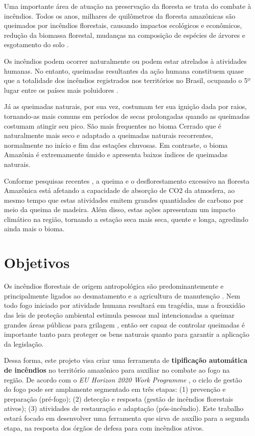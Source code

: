 Uma importante área de atuação na preservação da floresta se trata do combate à incêndios. Todos os anos, milhares de quilômetros da floresta amazônicas são queimados por incêndios florestais, causando impactos ecológicos e econômicos, redução da biomassa florestal, mudanças na composição de espécies de árvores e esgotamento do solo \cite{penha}. 

Os incêndios podem ocorrer naturalmente ou podem estar atrelados à atividades humanas. No entanto, queimadas resultantes da ação humana constituem quase que a totalidade dos incêndios registrados nos territórios no Brasil, ocupando o 5º lugar entre os países mais poluidores \cite{bdqueimadas}.

Já as queimadas naturais, por sua vez, costumam ter sua ignição dada por raios, tornando-as mais comuns em períodos de secas prolongadas quando as queimadas costumam atingir seu pico. São mais frequentes no bioma Cerrado que é naturalmente mais seco e adaptado a queimadas naturais recorrentes, normalmente no início e fim das estações chuvosas. Em contraste, o bioma Amazônia é extremamente úmido e apresenta baixos índices de queimadas naturais.

Conforme pesquisas recentes \cite{amazonia_carbono}, a queima e o desflorestamento excessivo na floresta Amazônica está afetando a capacidade de absorção de CO2 da atmosfera, ao mesmo tempo que estas atividades emitem grandes quantidades de carbono por meio da queima de madeira. Além disso, estas ações apresentam um impacto climático na região, tornando a estação seca mais seca, quente e longa, agredindo ainda mais o bioma.

\section{Objetivos}

Os incêndios florestais de origem antropológica são predominantemente e principalmente ligados ao desmatamento e a agricultura de manutenção \cite{severidade}. Nem todo fogo iniciado por atividade humana resultará em tragédia, mas a frouxidão das leis de proteção ambiental estimula pessoas mal intencionadas a queimar grandes áreas públicas para grilagem \cite{jornal_ambiental}, então ser capaz de controlar queimadas é importante tanto para proteger os bens naturais quanto para garantir a aplicação da legislação.

Dessa forma, este projeto visa criar uma ferramenta de \textbf{tipificação automática de incêndios} no território amazônico para auxiliar no combate ao fogo na região. De acordo com o \textit{EU Horizon 2020 Work Programme} \cite{horizon}, o ciclo de gestão do fogo pode ser amplamente segmentado em três etapas: (1) prevenção e preparação (pré-fogo); (2) detecção e resposta (gestão de incêndios florestais ativos); (3) atividades de restauração e adaptação (pós-incêndio). Este trabalho estará focado em desenvolver uma ferramenta que sirva de auxílio para a segunda etapa, na resposta dos órgãos de defesa para com incêndios ativos.

